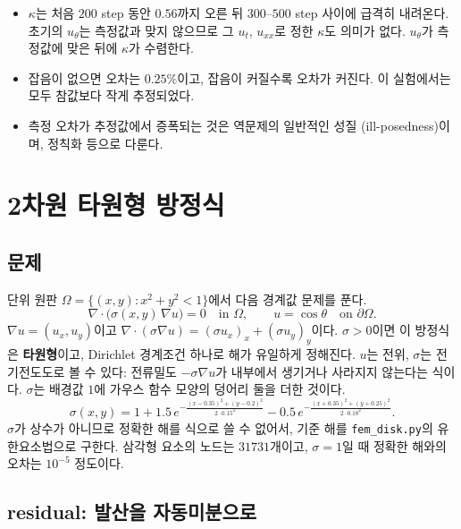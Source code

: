 \documentclass[11pt,a4paper]{article}
\begin{document}
\begin{itemize}[leftmargin=1.5em]
\item $\kappa$는 처음 $200$ step 동안 $0.56$까지 오른 뒤 $300$--$500$ step 사이에 급격히 내려온다.
초기의 $u_\theta$는 측정값과 맞지 않으므로 그 $u_t$, $u_{xx}$로 정한 $\kappa$도 의미가 없다. $u_\theta$가 측정값에 맞은 뒤에 $\kappa$가 수렴한다.
\item 잡음이 없으면 오차는 $0.25\%$이고, 잡음이 커질수록 오차가 커진다. 이 실험에서는 모두 참값보다 작게 추정되었다.
\item 측정 오차가 추정값에서 증폭되는 것은 역문제의 일반적인 성질 (ill-posedness)이며, 정칙화 등으로 다룬다.
\end{itemize}

\section{2차원 타원형 방정식}\label{sec:elliptic}

\subsection{문제}

단위 원판 $\Omega=\{(x,y):x^2+y^2<1\}$에서 다음 경계값 문제를 푼다.
\begin{equation}\label{eq:elliptic}
\nabla\cdot\big(\sigma(x,y)\,\nabla u\big)=0\quad\text{in }\Omega,\qquad u=\cos\theta\quad\text{on }\partial\Omega.
\end{equation}
$\nabla u=(u_x,u_y)$이고 $\nabla\cdot(\sigma\nabla u)=(\sigma u_x)_x+(\sigma u_y)_y$이다.
$\sigma>0$이면 이 방정식은 \textbf{타원형}이고, Dirichlet 경계조건 하나로 해가 유일하게 정해진다.
$u$는 전위, $\sigma$는 전기전도도로 볼 수 있다: 전류밀도 $-\sigma\nabla u$가 내부에서 생기거나 사라지지 않는다는 식이다.
$\sigma$는 배경값 $1$에 가우스 함수 모양의 덩어리 둘을 더한 것이다.
\[
\sigma(x,y)=1+1.5\,e^{-\frac{(x-0.35)^2+(y-0.2)^2}{2\cdot0.15^2}}-0.5\,e^{-\frac{(x+0.35)^2+(y+0.25)^2}{2\cdot0.18^2}}.
\]
$\sigma$가 상수가 아니므로 정확한 해를 식으로 쓸 수 없어서,
기준 해를 \texttt{fem\_disk.py}의 유한요소법으로 구한다. 삼각형 요소의 노드는 $31731$개이고,
$\sigma=1$일 때 정확한 해와의 오차는 $10^{-5}$ 정도이다.

\subsection{residual: 발산을 자동미분으로}
\end{document}
